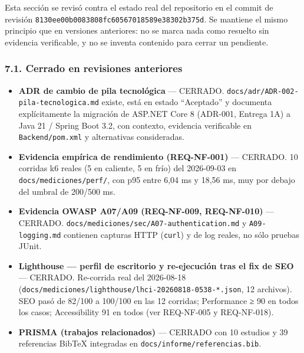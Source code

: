 \documentclass[
  spanish,
]{article}
\providecommand{\tightlist}{%
  \setlength{\itemsep}{0pt}\setlength{\parskip}{0pt}}
\begin{document}
Esta sección se revisó contra el estado real del repositorio en el
commit de revisión \texttt{8130ee00b0083808\allowbreak{}fc60567018589e38\allowbreak{}302b375d}. Se
mantiene el mismo principio que en versiones anteriores: no se marca
nada como resuelto sin evidencia verificable, y no se inventa contenido
para cerrar un pendiente.

\subsubsection{7.1. Cerrado en revisiones
anteriores}\label{cerrado-en-revisiones-anteriores}

\begin{itemize}
\tightlist
\item
  \textbf{ADR de cambio de pila tecnológica} --- CERRADO.
  \texttt{docs/\allowbreak{}adr/\allowbreak{}ADR-\allowbreak{}002-\allowbreak{}pila-\allowbreak{}tecnologica.\allowbreak{}md} existe, está en estado
  ``Aceptado'' y documenta explícitamente la migración de ASP.NET Core 8
  (ADR-001, Entrega 1A) a Java 21 / Spring Boot 3.2, con contexto,
  evidencia verificable en \texttt{Backend/\allowbreak{}pom.\allowbreak{}xml} y alternativas
  consideradas.
\item
  \textbf{Evidencia empírica de rendimiento (REQ-NF-001)} --- CERRADO.
  10 corridas k6 reales (5 en caliente, 5 en frío) del 2026-09-03 en
  \texttt{docs/\allowbreak{}mediciones/\allowbreak{}perf/}, con p95 entre 6,04 ms y 18,56 ms, muy
  por debajo del umbral de 200/500 ms.
\item
  \textbf{Evidencia OWASP A07/A09 (REQ-NF-009, REQ-NF-010)} --- CERRADO.
  \texttt{docs/\allowbreak{}mediciones/\allowbreak{}sec/\allowbreak{}A07-\allowbreak{}authentication.\allowbreak{}md} y
  \texttt{A09-\allowbreak{}logging.\allowbreak{}md} contienen capturas HTTP (\texttt{curl}) y de
  log reales, no sólo pruebas JUnit.
\item
  \textbf{Lighthouse --- perfil de escritorio y re-ejecución tras el fix
  de SEO} --- CERRADO. Re-corrida real del 2026-08-18
  (\texttt{docs/\allowbreak{}mediciones/\allowbreak{}lighthouse/\allowbreak{}lhci-\allowbreak{}20260818-\allowbreak{}0538-*.\allowbreak{}json}, 12
  archivos). SEO pasó de 82/100 a 100/100 en las 12 corridas;
  Performance ≥ 90 en todos los casos; Accessibility 91 en todos (ver
  REQ-NF-005 y REQ-NF-018).
\item
  \textbf{PRISMA (trabajos relacionados)} --- CERRADO con 10 estudios y
  39 referencias BibTeX integradas en
  \texttt{docs/\allowbreak{}informe/\allowbreak{}referencias.\allowbreak{}bib}.

\end{itemize}
\end{document}
